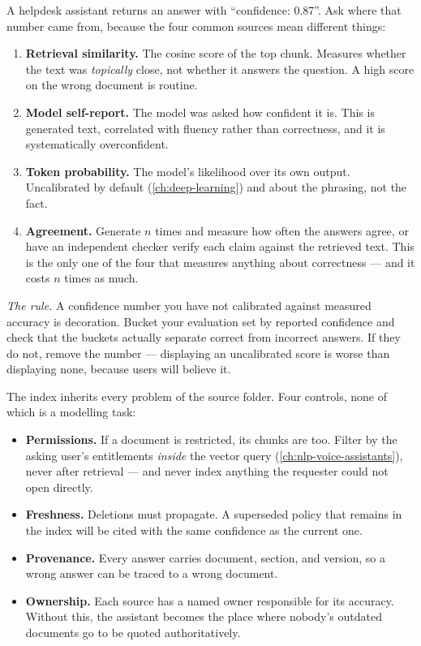 \begin{workedexample}
A helpdesk assistant returns an answer with ``confidence: 0.87''. Ask where
that number came from, because the four common sources mean different things:

\begin{enumerate}
  \item \textbf{Retrieval similarity.} The cosine score of the top chunk.
    Measures whether the text was \emph{topically} close, not whether it
    answers the question. A high score on the wrong document is routine.
  \item \textbf{Model self-report.} The model was asked how confident it is.
    This is generated text, correlated with fluency rather than correctness,
    and it is systematically overconfident.
  \item \textbf{Token probability.} The model's likelihood over its own
    output. Uncalibrated by default (\cref{ch:deep-learning}) and about the
    phrasing, not the fact.
  \item \textbf{Agreement.} Generate $n$ times and measure how often the
    answers agree, or have an independent checker verify each claim against
    the retrieved text. This is the only one of the four that measures
    anything about correctness --- and it costs $n$ times as much.
\end{enumerate}

\emph{The rule.} A confidence number you have not calibrated against measured
accuracy is decoration. Bucket your evaluation set by reported confidence and
check that the buckets actually separate correct from incorrect answers. If
they do not, remove the number --- displaying an uncalibrated score is worse
than displaying none, because users will believe it.
\end{workedexample}

\begin{engineernote}
The index inherits every problem of the source folder. Four controls, none of
which is a modelling task:
\begin{itemize}
  \item \textbf{Permissions.} If a document is restricted, its chunks are too.
    Filter by the asking user's entitlements \emph{inside} the vector query
    (\cref{ch:nlp-voice-assistants}), never after retrieval --- and never
    index anything the requester could not open directly.
  \item \textbf{Freshness.} Deletions must propagate. A superseded policy that
    remains in the index will be cited with the same confidence as the current
    one.
  \item \textbf{Provenance.} Every answer carries document, section, and
    version, so a wrong answer can be traced to a wrong document.
  \item \textbf{Ownership.} Each source has a named owner responsible for its
    accuracy. Without this, the assistant becomes the place where nobody's
    outdated documents go to be quoted authoritatively.
\end{itemize}
\end{engineernote}

